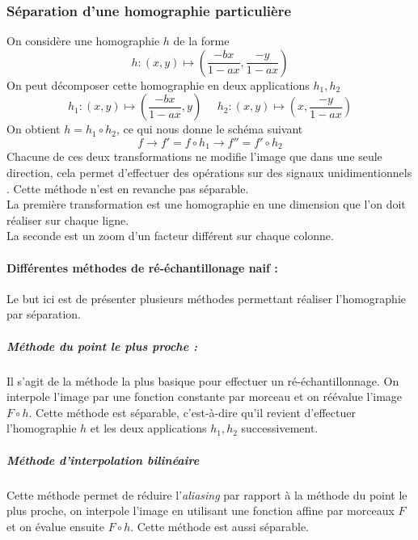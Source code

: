 \subsubsection{Séparation d'une homographie particulière }
\label{homobox_paragraph}
On considère une homographie $h$ de la forme 
\begin{equation*}
h:(x,y)\mapsto \left(\frac{-bx}{1-ax},\frac{-y}{1-ax}\right)
\end{equation*}
On peut décomposer cette homographie en deux applications $h_1 , h_2$
\begin{equation*}
h_1:(x,y) \mapsto \left(\frac{-bx}{1-ax}    ,y\right)~~~~~~h_2:(x,y) \mapsto \left(x,\frac{-y}{1-ax}\right)
\end{equation*}
On obtient $h=h_1  \circ h_2$, ce qui nous donne le schéma suivant 
\begin{equation*}
f\longrightarrow f'=f\circ h_1 \longrightarrow f''=f'\circ h_2
\end{equation*}
Chacune de ces deux transformations ne modifie l'image que dans une seule direction, cela permet d'effectuer des opérations sur des signaux unidimentionnels . Cette méthode n'est en revanche pas séparable.\\ 
La première transformation est une homographie en une dimension que l'on doit réaliser sur chaque ligne.\\ %
La seconde est un zoom d'un facteur différent sur chaque colonne.

\paragraph{Différentes méthodes de ré-échantillonage naif :}
Le but ici est de présenter plusieurs méthodes permettant réaliser l'homographie par séparation.

\subparagraph{Méthode du point le plus proche :}
Il s'agit de la méthode la plus basique pour effectuer un ré-échantillonnage. On interpole l'image  par une fonction constante par morceau et on réévalue l'image $F\circ h $. Cette méthode est séparable, c'est-à-dire qu'il revient d'effectuer l'homographie $h$ et les deux applications $h_1 , h_2$ successivement.

\subparagraph{Méthode d'interpolation bilinéaire}
Cette méthode permet de réduire l'\emph{aliasing} par rapport à la méthode du point le plus proche, on interpole l'image en utilisant une fonction affine par morceaux $F$ et on évalue ensuite $F\circ h$. Cette méthode est aussi séparable.

